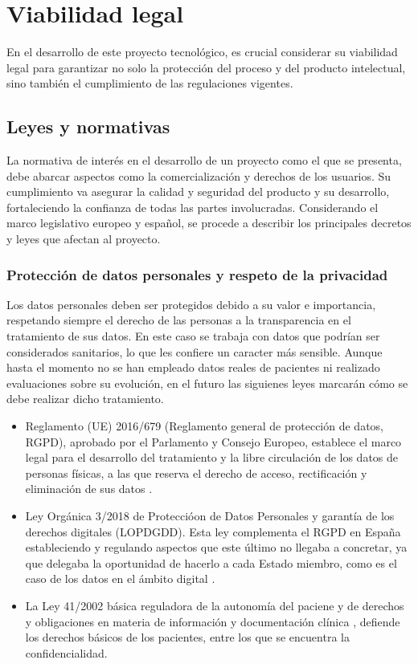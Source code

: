 \section{Viabilidad legal}
En el desarrollo de este proyecto tecnológico, es crucial considerar su viabilidad legal para garantizar no solo la protección del proceso y del producto intelectual, sino también el cumplimiento de las regulaciones vigentes.

\subsection{Leyes y normativas}
 La normativa de interés en el desarrollo de un proyecto como el que se presenta, debe abarcar aspectos como la comercialización y derechos de los usuarios. Su cumplimiento va asegurar la calidad y seguridad del producto y su desarrollo, fortaleciendo la confianza de todas las partes involucradas.
Considerando el marco legislativo europeo y español, se procede a describir los principales decretos y leyes que afectan al proyecto.

\subsubsection{Protección de datos personales y respeto de la privacidad}
Los datos personales deben ser protegidos debido a su valor e importancia, respetando siempre el derecho de las personas a la transparencia en el tratamiento de sus datos. En este caso se trabaja con datos que podrían ser considerados sanitarios, lo que les confiere un caracter más sensible. Aunque hasta el momento no se han empleado datos reales de pacientes ni realizado evaluaciones sobre su evolución, en el futuro las siguienes leyes marcarán cómo se debe realizar dicho tratamiento.

\begin{itemize}
    \item Reglamento (UE) 2016/679 (Reglamento general de protección de datos, RGPD), aprobado por el Parlamento y Consejo Europeo, establece el marco legal para el desarrollo del tratamiento y la libre circulación de los datos de personas físicas, a las que reserva el derecho de acceso, rectificación y eliminación de sus datos \cite{BOE_RGPD:online}.
    \item Ley Orgánica 3/2018 de Proteccióon de Datos Personales y garantía de los derechos digitales (LOPDGDD). Esta ley complementa el RGPD en España estableciendo y regulando aspectos que este último no llegaba a concretar, ya que delegaba la oportunidad de hacerlo a cada Estado miembro, como es el caso de los datos en el ámbito digital\cite{BOE_LOPDGDD:online} \cite{BOE_RGPD:online}.
    \item La Ley 41/2002 básica reguladora de la autonomía del paciene y de derechos y obligaciones en materia de información y documentación clínica \cite{BOE_41/2002:online}, defiende los derechos básicos de los pacientes, entre los que se encuentra la confidencialidad.
\end{itemize}


